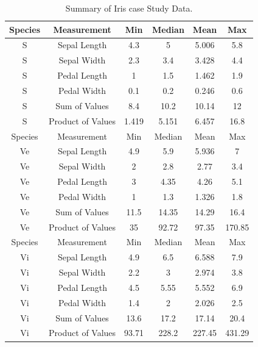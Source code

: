 \documentclass[12pt,]{article}
\begin{document}
\begin{table}[!h]
\centering
\begin{tabular}{|c|c|cccc|}
\hline
Species                 & Measurement       & Min   & Median & Mean   & Max    \\
\hline
S                       & Sepal Length      & 4.3   & 5      & 5.006  & 5.8    \\ 
S                       & Sepal Width       & 2.3   & 3.4    & 3.428  & 4.4    \\ 
S                       & Pedal Length      & 1     & 1.5    & 1.462  & 1.9    \\ 
S                       & Pedal Width       & 0.1   & 0.2    & 0.246  & 0.6    \\ 
S                       & Sum of Values     & 8.4   & 10.2   & 10.14  & 12     \\ 
S                       & Product of Values & 1.419 & 5.151  & 6.457  & 16.8   \\ 
\hline
Species                 & Measurement       & Min   & Median & Mean   & Max    \\
\hline
Ve                      & Sepal Length      & 4.9   & 5.9    & 5.936  & 7      \\
Ve                      & Sepal Width       & 2     & 2.8    & 2.77   & 3.4    \\
Ve                      & Pedal Length      & 3     & 4.35   & 4.26   & 5.1    \\
Ve                      & Pedal Width       & 1     & 1.3    & 1.326  & 1.8    \\
Ve                      & Sum of Values     & 11.5  & 14.35  & 14.29  & 16.4   \\
Ve                      & Product of Values & 35    & 92.72  & 97.35  & 170.85 \\
\hline
Species                 & Measurement       & Min   & Median & Mean   & Max    \\
\hline
Vi                      & Sepal Length      & 4.9   & 6.5    & 6.588  & 7.9    \\
Vi                      & Sepal Width       & 2.2   & 3      & 2.974  & 3.8    \\
Vi                      & Pedal Length      & 4.5   & 5.55   & 5.552  & 6.9    \\
Vi                      & Pedal Width       & 1.4   & 2      & 2.026  & 2.5    \\
Vi                      & Sum of Values     & 13.6  & 17.2   & 17.14  & 20.4   \\
Vi                      & Product of Values & 93.71 & 228.2  & 227.45 & 431.29 \\
\hline
\end{tabular}
\caption[Iris Data Summary Table]{Summary of Iris case Study Data.}
\end{table}
\end{document}
